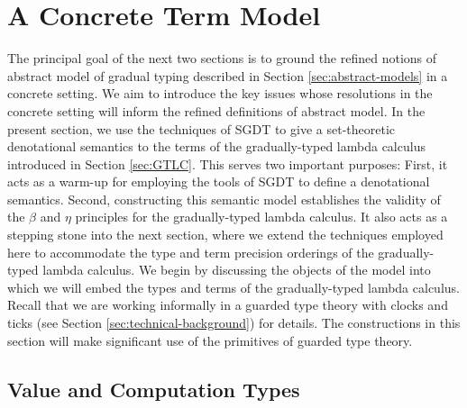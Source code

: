 \section{A Concrete Term Model}\label{sec:concrete-term-model}

The principal goal of the next two sections is to ground the refined notions of
abstract model of gradual typing described in Section \ref{sec:abstract-models}
in a concrete setting. We aim to introduce the key issues whose resolutions in
the concrete setting will inform the refined definitions of abstract model.
%
In the present section, we use the techniques of SGDT to give a set-theoretic
denotational semantics to the terms of the gradually-typed lambda calculus
introduced in Section \ref{sec:GTLC}. This serves two important purposes: First,
it acts as a warm-up for employing the tools of SGDT to define a denotational
semantics. Second, constructing this semantic model establishes the validity of
the $\beta$ and $\eta$ principles for the gradually-typed lambda calculus. It
also acts as a stepping stone into the next section, where we extend the
techniques employed here to accommodate the type and term precision orderings of
the gradually-typed lambda calculus.
%
%
%
%
We begin by discussing the objects of the model into which we will embed the
types and terms of the gradually-typed lambda calculus. Recall that we are
working informally in a guarded type theory with clocks and ticks (see Section
\ref{sec:technical-background}) for details. The constructions in this section
will make significant use of the primitives of guarded type theory.

\subsection{Value and Computation Types}



